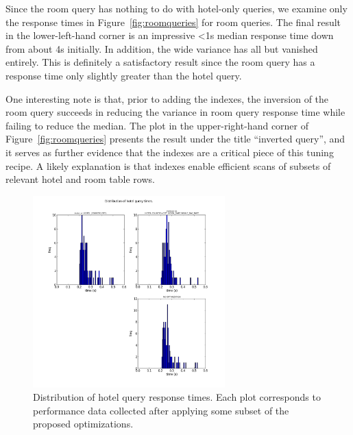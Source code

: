 \documentclass[letterpaper]{article}%
\begin{document}
Since the room query has nothing to do with hotel-only queries, we examine only
the response times in Figure~\ref{fig:roomqueries} for room queries. The final
result in the lower-left-hand corner is an impressive \textless{}1s median response time
down from about 4s initially. In addition, the wide variance has all but
vanished entirely. This is definitely a satisfactory result since the room
query has a response time only slightly greater than the hotel query.

One interesting note is that, prior to adding the indexes, the inversion of the
room query succeeds in reducing the variance in room query response time while
failing to reduce the median. The plot in the upper-right-hand corner of
Figure~\ref{fig:roomqueries} presents the result under the title ``inverted
query'', and it serves as further evidence that the indexes are a critical
piece of this tuning recipe. A likely explanation is that indexes enable
efficient scans of subsets of relevant hotel and room table rows.

\begin{figure}[ht]
  \centering
  \includegraphics[width=0.66\textwidth]{../ReserveWithUsApp/benchmark_data/0.png}
  \caption{Distribution of hotel query response times. Each plot corresponds to
    performance data collected after applying some subset of the proposed
    optimizations.}
  \label{fig:hotelqueries}
\end{figure}
\end{document}

